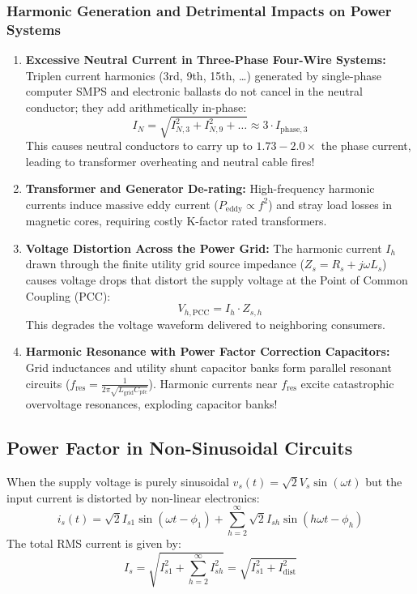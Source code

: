 \documentclass[11pt,a4paper]{article}
\let\origsubsection\subsection
\renewcommand{\subsection}{\Needspace{7\baselineskip}\origsubsection}
\begin{document}
\subsubsection{Harmonic Generation and Detrimental Impacts on Power Systems}
\begin{enumerate}[leftmargin=*]
  \item \textbf{Excessive Neutral Current in Three-Phase Four-Wire Systems:} Triplen current harmonics (3rd, 9th, 15th, \dots) generated by single-phase computer SMPS and electronic ballasts do not cancel in the neutral conductor; they add arithmetically in-phase:
  \begin{equation}
  I_N = \sqrt{I_{N,3}^2 + I_{N,9}^2 + \dots} \approx 3 \cdot I_{\text{phase},3}
  \end{equation}
  This causes neutral conductors to carry up to $1.73 - 2.0 \times$ the phase current, leading to transformer overheating and neutral cable fires!
  \item \textbf{Transformer and Generator De-rating:} High-frequency harmonic currents induce massive eddy current ($P_{\text{eddy}} \propto f^2$) and stray load losses in magnetic cores, requiring costly K-factor rated transformers.
  \item \textbf{Voltage Distortion Across the Power Grid:} The harmonic current $I_h$ drawn through the finite utility grid source impedance ($Z_s = R_s + j\omega L_s$) causes voltage drops that distort the supply voltage at the Point of Common Coupling (PCC):
  \begin{equation}
  V_{h,\text{PCC}} = I_h \cdot Z_{s,h}
  \end{equation}
  This degrades the voltage waveform delivered to neighboring consumers.
  \item \textbf{Harmonic Resonance with Power Factor Correction Capacitors:} Grid inductances and utility shunt capacitor banks form parallel resonant circuits ($f_{\text{res}} = \frac{1}{2\pi\sqrt{L_{\text{grid}} C_{\text{pfc}}}}$). Harmonic currents near $f_{\text{res}}$ excite catastrophic overvoltage resonances, exploding capacitor banks!
\end{enumerate}

\subsection{Power Factor in Non-Sinusoidal Circuits}

When the supply voltage is purely sinusoidal $v_s(t) = \sqrt{2}V_s \sin(\omega t)$ but the input current is distorted by non-linear electronics:
\begin{equation}
i_s(t) = \sqrt{2}I_{s1} \sin(\omega t - \phi_1) + \sum_{h=2}^{\infty} \sqrt{2}I_{sh} \sin(h\omega t - \phi_h)
\end{equation}
The total RMS current is given by:
\begin{equation}
I_s = \sqrt{I_{s1}^2 + \sum_{h=2}^\infty I_{sh}^2} = \sqrt{I_{s1}^2 + I_{\text{dist}}^2}
\end{equation}
\end{document}
